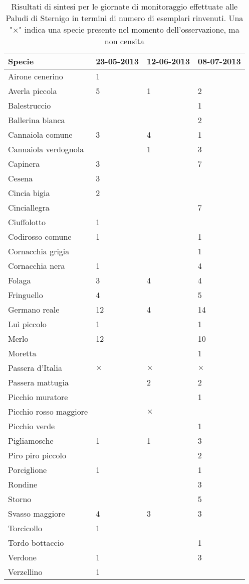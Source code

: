 \documentclass[11pt,a4paper,twoside]{memoir}
\begin{document}
\begin{table}[H]
\centering
\begin{tabular}{llll}
\toprule                
\textbf{  Specie  } & \textbf{  23-05-2013  } & \textbf{  12-06-2013  } & \textbf{  08-07-2013  } \\
\midrule                
  Airone cenerino & 1 &   &   \\
  Averla piccola  & 5 & 1 & 2 \\
  Balestruccio  &   &   & 1 \\
  Ballerina bianca  &   &   & 2 \\
  Cannaiola comune  & 3 & 4 & 1 \\
  Cannaiola verdognola  &   & 1 & 3 \\
  Capinera  & 3 &   & 7 \\
  Cesena  & 3 &   &   \\
  Cincia bigia  & 2 &   &   \\
  Cinciallegra  &   &   & 7 \\
  Ciuffolotto & 1 &   &   \\
  Codirosso comune  & 1 &   & 1 \\
  Cornacchia grigia &   &   & 1 \\
  Cornacchia nera & 1 &   & 4 \\
  Folaga  & 3 & 4 & 4 \\
  Fringuello  & 4 &   & 5 \\
  Germano reale & 12  & 4 & 14  \\
  Luì piccolo & 1 &   & 1 \\
  Merlo & 12  &   & 10  \\
  Moretta &   &   & 1 \\
  Passera d'Italia  & $\times$ & $\times$ & $\times$ \\
  Passera mattugia  &   & 2 & 2 \\
  Picchio muratore  &   &   & 1 \\
  Picchio rosso maggiore  &   & $\times$ &   \\
  Picchio verde &   &   & 1 \\
  Pigliamosche  & 1 & 1 & 3 \\
  Piro piro piccolo &   &   & 2 \\
  Porciglione & 1 &   & 1 \\
  Rondine &   &   & 3 \\
  Storno  &   &   & 5 \\
  Svasso maggiore & 4 & 3 & 3 \\
  Torcicollo  & 1 &   &   \\
  Tordo bottaccio &   &   & 1 \\
  Verdone & 1 &   & 3 \\
  Verzellino  & 1 &   &   \\
\bottomrule               
\end{tabular}
\caption{Risultati di sintesi per le giornate di monitoraggio effettuate alle Paludi di Sternigo in termini di numero di esemplari rinvenuti. Una "$\times$" indica una specie presente nel momento dell'osservazione, ma non censita}
\end{table}
\end{document}

